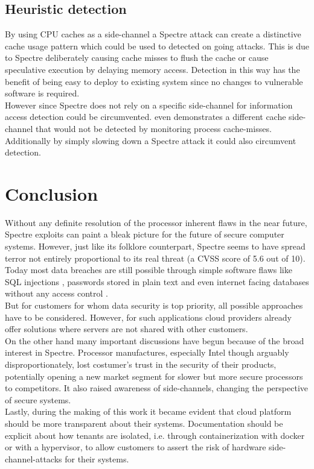 \documentclass[conference,compsoc,final,a4paper]{IEEEtran}
\begin{document}
\subsection{Heuristic detection}
By using CPU caches as a side-channel a Spectre attack can create a distinctive cache usage pattern which could be used to detected on going attacks. \cite{depoix2018}
This is due to Spectre deliberately causing cache misses to flush the cache or cause speculative execution by delaying memory access. Detection in this way has the
benefit of being easy to deploy to existing system since no changes to vulnerable software is required. \cite{depoix2018, chiappetta2016real} \\
However since Spectre does not rely on a specific side-channel for information access \cite{kocher2018spectre} detection could be circumvented. \textcite{gruss2016flush+}
even demonstrates a different cache side-channel that would not be detected by monitoring process cache-misses. \\
Additionally by simply slowing down a Spectre attack it could also circumvent detection. \cite{chiappetta2016real}
\section{Conclusion}
Without any definite resolution of the processor inherent flaws in the near future, Spectre exploits can paint a bleak picture for the future of secure computer systems. However, just like its folklore counterpart, Spectre seems to have spread terror not entirely proportional to its real threat (a CVSS score of 5.6 out of 10)\cite{cveSpectre}. \\
Today most data breaches are still possible through simple software flaws like SQL injections \cite{magnetoSQLi}, passwords stored in plain text \cite{facebookPlainText} and even internet facing databases without any access control \cite{unistellarMongoDB}. \\
But for customers for whom data security is top priority, all possible approaches have to be considered. However, for such applications cloud providers already offer solutions where servers are not shared with other customers. \cite{AWSDedicated} \\
On the other hand many important discussions have begun because of the broad interest in Spectre. Processor manufactures, especially Intel though arguably disproportionately, lost costumer's trust in the security of their products, potentially opening a new market segment for slower but more secure processors to competitors. It also raised awareness of side-channels, changing the perspective of secure systems. \\
Lastly, during the making of this work it became evident that cloud platform should be more transparent about their systems. Documentation should be explicit about how tenants are isolated, i.e. through containerization with docker or with a hypervisor, to allow customers to assert the risk of hardware side-channel-attacks for their systems.
\end{document}
